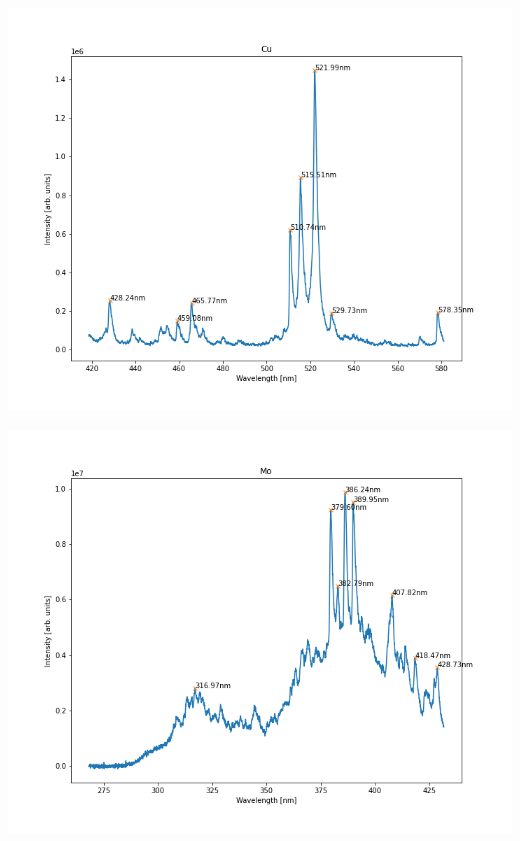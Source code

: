 \documentclass{beamer}
\begin{document}
\begin{frame}
    \includegraphics[scale=0.45]{Cu/Cu_500.png}
\end{frame}

\begin{frame}
    \includegraphics[scale=0.45]{Mo/Mo_350.png}
\end{frame}
\end{document}
